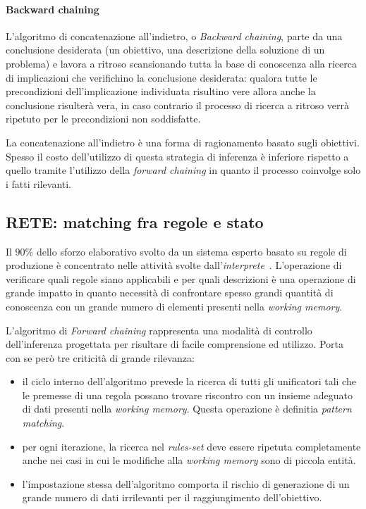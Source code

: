 \paragraph{Backward chaining}
L'algoritmo di concatenazione all'indietro, o \emph{Backward chaining}, parte da una conclusione desiderata (un obiettivo, una descrizione della soluzione di un problema) e lavora a ritroso scansionando tutta la base di conoscenza alla ricerca di implicazioni che verifichino la conclusione desiderata: qualora tutte le precondizioni dell'implicazione individuata risultino vere allora anche la conclusione risulterà vera, in caso contrario il processo di ricerca a ritroso verrà ripetuto per le precondizioni non soddisfatte.

La concatenazione all'indietro è una forma di ragionamento basato sugli obiettivi. Spesso il costo dell'utilizzo di questa strategia di inferenza è inferiore rispetto a quello tramite l'utilizzo della \emph{forward chaining} in quanto il processo coinvolge solo i fatti rilevanti. \cite{russellnorvig2009}

\subsection{RETE: matching fra regole e stato}

Il $90\%$ dello sforzo elaborativo svolto da un sistema esperto basato su regole di produzione è concentrato nelle attività svolte dall'\emph{interprete}~\cite{forgy1982}. L'operazione di verificare quali regole siano applicabili e per quali descrizioni è una operazione di grande impatto in quanto necessità di confrontare spesso grandi quantità di conoscenza con un grande numero di elementi presenti nella \emph{working memory}.

L'algoritmo di \emph{Forward chaining} rappresenta una modalità di controllo dell'inferenza progettata per risultare di facile comprensione ed utilizzo. Porta con se però tre criticità di grande rilevanza: \cite{russellnorvig2009}
\begin{itemize}
	\item il ciclo interno dell'algoritmo prevede la ricerca di tutti gli unificatori tali che le premesse di una regola possano trovare riscontro con un insieme adeguato di dati presenti nella \emph{working memory}. Questa operazione è definitia \emph{pattern matching}.
	\item per ogni iterazione, la ricerca nel \emph{rules-set} deve essere ripetuta completamente anche nei casi in cui le modifiche alla \emph{working memory} sono di piccola entità.
	\item l'impostazione stessa dell'algoritmo comporta il rischio di generazione di un grande numero di dati irrilevanti per il raggiungimento dell'obiettivo.
\end{itemize}

